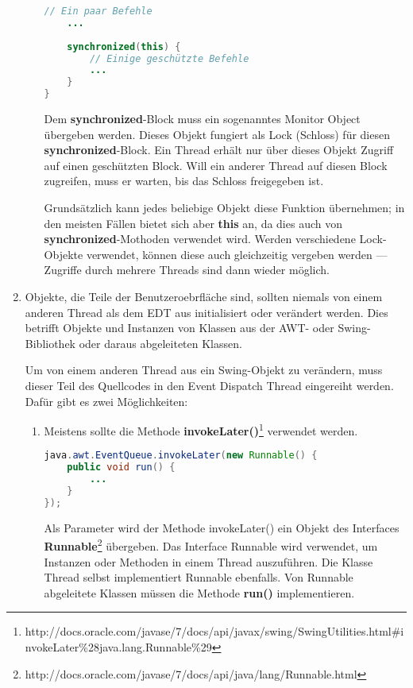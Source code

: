 \begin{enumerate}
\begin{enumerate}
\begin{lstlisting}[language=JAVA]
	// Ein paar Befehle
	...
	
	synchronized(this) {
		// Einige geschützte Befehle
		...
	}
}
\end{lstlisting}

Dem \textbf{synchronized}-Block muss ein sogenanntes \glqq{}Monitor Object\grqq{} übergeben werden. Dieses Objekt fungiert als \glqq{}Lock\grqq{} (Schloss) für diesen \textbf{synchronized}-Block. Ein Thread erhält nur über dieses Objekt Zugriff auf einen geschützten Block. Will ein anderer Thread auf diesen Block zugreifen, muss er warten, bis das \glqq{}Schloss\grqq{} freigegeben ist.

Grundsätzlich kann jedes beliebige Objekt diese Funktion übernehmen; in den meisten Fällen bietet sich aber \textbf{this} an, da dies auch von \textbf{synchronized}-Mothoden verwendet wird. Werden verschiedene Lock-Objekte verwendet, können diese auch gleichzeitig vergeben werden --- Zugriffe durch mehrere Threads sind dann wieder möglich.
\end{enumerate}

\item Objekte, die Teile der Benutzeroebrfläche sind, sollten niemals von einem anderen Thread  als dem EDT aus initialisiert oder verändert werden. Dies betrifft Objekte und Instanzen von Klassen aus der AWT- oder Swing-Bibliothek oder daraus abgeleiteten Klassen.%

Um von einem anderen Thread aus ein Swing-Objekt zu verändern, muss dieser Teil des Quellcodes in den Event Dispatch Thread eingereiht werden. Dafür gibt es zwei Möglichkeiten:
\begin{enumerate}
\item Meistens sollte die Methode \textbf{invokeLater()}\footnote{http://docs.oracle.com/javase/7/docs/api/javax/swing/SwingUtilities.html\#invokeLater\%28java.lang.Runnable\%29} verwendet werden.
\begin{lstlisting}[language=JAVA]
java.awt.EventQueue.invokeLater(new Runnable() {
	public void run() {
		...
	}
});
\end{lstlisting}
	Als Parameter wird der Methode invokeLater() ein Objekt des Interfaces \textbf{Runnable}\footnote{http://docs.oracle.com/javase/7/docs/api/java/lang/Runnable.html} übergeben. Das Interface Runnable wird verwendet, um Instanzen oder Methoden in einem Thread auszuführen. Die Klasse Thread selbst implementiert Runnable ebenfalls. Von Runnable abgeleitete Klassen müssen die Methode \textbf{run()} implementieren.
	

\end{enumerate}
\end{enumerate}
